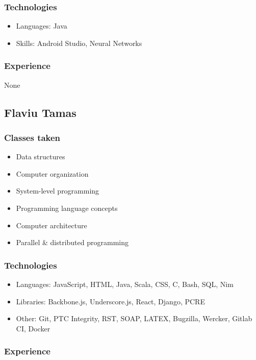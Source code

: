 \documentclass[
10pt, %
letterpaper, %
oneside, %
headinclude,footinclude, %
BCOR5mm, %
]{scrartcl}
\begin{document}
\subsubsection{Technologies}

\begin{itemize}
\item
  Languages: Java
\item
  Skills: Android Studio, Neural Networks
\end{itemize}

\subsubsection{Experience}

None

\subsection{Flaviu Tamas}

\subsubsection{Classes taken}

\begin{itemize}
\item
  Data structures
\item
  Computer organization
\item
  System-level programming
\item
  Programming language concepts
\item
  Computer architecture
\item
  Parallel \& distributed programming
\end{itemize}

\subsubsection{Technologies}

\begin{itemize}
\item
  Languages: JavaScript, HTML, Java, Scala, CSS, C, Bash, SQL, Nim
\item
  Libraries: Backbone.js, Underscore.js, React, Django, PCRE
\item
  Other: Git, PTC Integrity, RST, SOAP, LATEX, Bugzilla, Wercker, Gitlab
  CI, Docker
\end{itemize}

\subsubsection{Experience}
\end{document}
